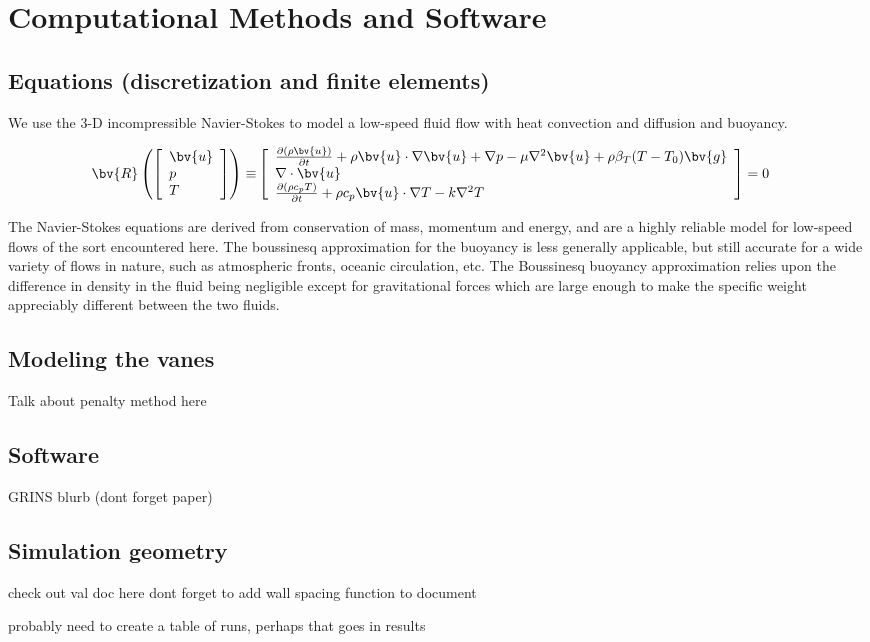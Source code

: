 \section{Computational Methods and Software}
\label{sec:method}

\subsection{Equations (discretization and finite elements)}

We use the 3-D incompressible Navier-Stokes to model a
low-speed fluid flow with heat convection and diffusion and buoyancy. 

\begin{align*}
    \bv{R}\left(\left[
    \begin{array}{l}
        \bv{u} \\
        p \\
        T 
    \end{array}
    \right]\right) \equiv& 
    \left[
    \begin{array}{l}
        \frac{\partial (\rho \bv{u})}{\partial t} + \rho \bv{u} \cdot
    \nabla \bv{u} + \nabla p - \mu \nabla^2 \bv{u} + 
    \rho \beta_T (T - T_0) \bv{g} \\
    \nabla \cdot \bv{u} \\
    \frac{\partial (\rho c_p T)}{\partial t} + \rho c_p \bv{u} \cdot
    \nabla T - k \nabla^2 T
    \end{array} 
    \right] = 0
\end{align*}

The Navier-Stokes equations are derived from conservation of mass,
momentum and energy, and are a highly reliable model for low-speed flows
of the sort encountered here. The boussinesq approximation for the
buoyancy is less generally applicable, but still accurate for a
wide variety of flows in nature, such as atmospheric fronts, oceanic
circulation, etc. The Boussinesq buoyancy approximation relies upon the
difference in density in the fluid being negligible except for gravitational
forces which are large enough to make the specific weight appreciably different
between the two fluids.


\subsection{Modeling the vanes}

Talk about penalty method here

\subsection{Software}

GRINS blurb (dont forget paper)

\subsection{Simulation geometry}

check out val doc here
dont forget to add wall spacing function to document

probably need to create a table of runs, perhaps that goes in results
